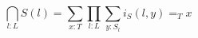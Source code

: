 \begin{equation}
    \bigcap _{l: L} S(l) = \sum_{x: T} \prod_{l: L} \sum_{y: S_l} i_S(l, y) =_T x
\end{equation}